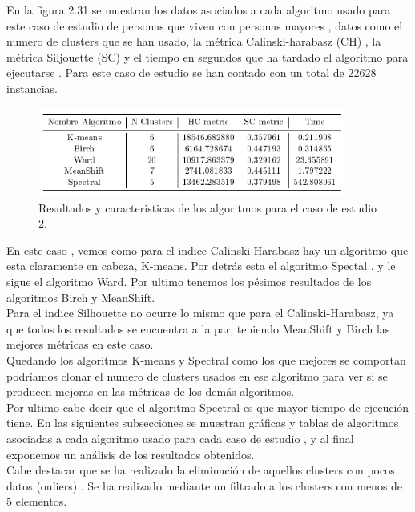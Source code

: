 	En la figura 2.31 se muestran los datos asociados a cada algoritmo usado para este caso de estudio
	de personas que viven con personas mayores , datos como el numero de clusters que se han usado,
	la métrica Calinski-harabasz (CH) , la métrica Siljouette (SC) y el tiempo en segundos que ha tardado
	el algoritmo para ejecutarse . Para este caso de estudio se han contado con un total de 22628 instancias.\\

	\begin{figure}[htb]
		\centering
		\includegraphics[width=0.9\textwidth]{./imagenes/caso2/metricas_algoritmos_caso2}
		\caption{Resultados y caracteristicas de los algoritmos para el caso de estudio 2.} \label{fig:1}
	\end{figure}

	En este caso , vemos como para el indice Calinski-Harabasz hay un algoritmo que esta claramente 
	en cabeza, K-means. Por detrás esta el algoritmo Spectal , y le sigue el algoritmo Ward. Por ultimo 
	tenemos los pésimos resultados de los algoritmos Birch y MeanShift.  \\

	Para el indice Silhouette no ocurre lo mismo que para el Calinski-Harabasz, ya que todos los resultados se encuentra a la par,
	teniendo MeanShift y Birch las mejores métricas en este caso. \\
	
	Quedando los algoritmos K-means y Spectral como los que mejores se comportan podríamos clonar el numero de clusters usados en ese algoritmo 
	para ver si se producen mejoras en las métricas de los demás algoritmos.\\

	Por ultimo cabe decir que el algoritmo Spectral es que mayor tiempo de ejecución tiene. En las siguientes subsecciones
	se muestran gráficas y tablas de algoritmos asociadas a cada algoritmo usado para cada caso de estudio
	, y al final exponemos un análisis de los resultados obtenidos.\\

	Cabe destacar que se ha realizado la eliminación de aquellos clusters con pocos datos (ouliers) . Se ha realizado mediante un 
	filtrado a los clusters con menos de 5 elementos. \\

